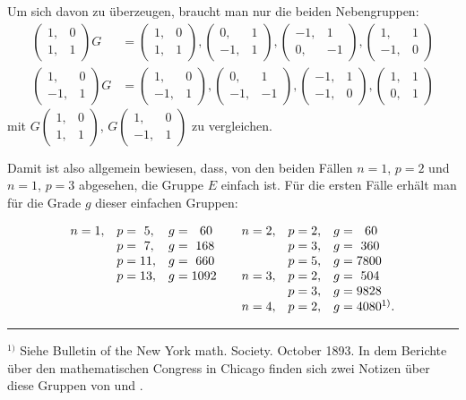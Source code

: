 Um sich davon zu überzeugen, braucht man nur die beiden
Nebengruppen:
\[
\begin{aligned}
\begin{pmatrix} 1, & 0 \\ 1, & 1 \end{pmatrix} G &=
\begin{pmatrix} 1, & 0 \\ 1, & 1 \end{pmatrix},
\begin{pmatrix} 0, & 1 \\ -1, & 1 \end{pmatrix},
\begin{pmatrix} -1, & 1 \\ 0, & -1 \end{pmatrix},
\begin{pmatrix} 1, & 1 \\ -1, & 0 \end{pmatrix} \\
\begin{pmatrix} 1, & 0 \\ -1, & 1 \end{pmatrix} G &=
\begin{pmatrix} 1, & 0 \\ -1, & 1 \end{pmatrix},
\begin{pmatrix} 0, & 1 \\ -1, & -1 \end{pmatrix},
\begin{pmatrix} -1, & 1 \\ -1, & 0 \end{pmatrix},
\begin{pmatrix} 1, & 1 \\ 0, & 1 \end{pmatrix}
\end{aligned}
\]
mit $G\begin{pmatrix} 1, & 0 \\ 1, & 1 \end{pmatrix}$, $G\begin{pmatrix} 1, & 0 \\ -1, & 1 \end{pmatrix}$
zu vergleichen.

Damit ist also allgemein bewiesen, dass, von den beiden
Fällen $n=1$, $p=2$ und $n=1$, $p=3$ abgesehen, die Gruppe $E$
einfach ist. Für die ersten Fälle erhält man für die Grade $g$
dieser einfachen Gruppen:

\[
\begin{array}{lll@{\qquad}lll}
n=1, & p=\ 5, & g=\ \ 60 & n=2, & p=2, & g=\ \ 60 \\
     & p=\ 7, & g=\ 168  &      & p=3, & g=\ 360 \\
     & p=11,  & g=\ 660  &      & p=5, & g=7800 \\
     & p=13,  & g=1092   & n=3, & p=2, & g=\ 504 \\
     &        &          &      & p=3, & g=9828 \\
     &        &          & n=4, & p=2, & g=4080^{1)}.
\end{array}
\]

\rule{4cm}{0.4pt}

$^{1)}$ Siehe Bulletin of the New York math. Society. October 1893. In
dem Berichte über den mathematischen Congress in Chicago finden sich
zwei Notizen über diese Gruppen von  und .
